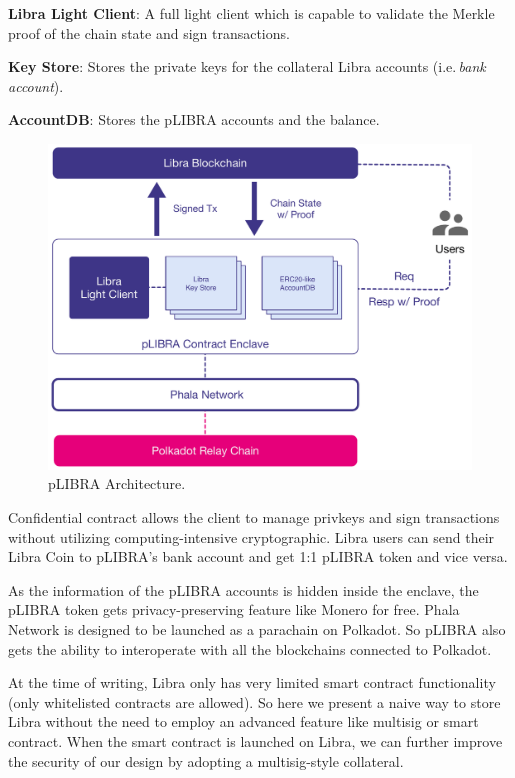 \begin{icompact}
    \item \textbf{Libra Light Client}: A full light client which is capable to validate the Merkle proof of the chain state and sign transactions.
    \item \textbf{Key Store}: Stores the private keys for the collateral Libra accounts (i.e.\,\textit{bank account}).
    \item \textbf{AccountDB}: Stores the pLIBRA accounts and the balance.
\end{icompact}

\begin{figure}
    \centering \footnotesize
    \includegraphics[width=.7\columnwidth]{img/pLIBRA-contract}
    \caption{pLIBRA Architecture.}
    \label{fig:plibra}
\end{figure}

Confidential contract allows the client to manage privkeys and sign transactions without utilizing computing-intensive cryptographic. Libra users can send their Libra Coin to pLIBRA's bank account and get 1:1 pLIBRA token and vice versa.

As the information of the pLIBRA accounts is hidden inside the enclave, the pLIBRA token gets privacy-preserving feature like Monero for free. Phala Network is designed to be launched as a parachain on Polkadot. So pLIBRA also gets the ability to interoperate with all the blockchains connected to Polkadot.

At the time of writing, Libra only has very limited smart contract functionality (only whitelisted contracts are allowed). So here we present a naive way to store Libra without the need to employ an advanced feature like multisig or smart contract. When the smart contract is launched on Libra, we can further improve the security of our design by adopting a multisig-style collateral.


